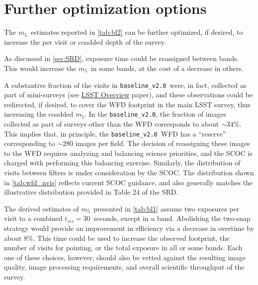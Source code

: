 \documentclass[PST,authoryear,toc]{lsstdoc}
\newcommand{\mf}{\ensuremath{m_5}}
\newcommand{\baseline}{\texttt{baseline\_v2.0}}
\begin{document}
\FloatBarrier


 
\section{Further optimization options}

The \mf\ estimates reported in \autoref{tab:bl2} can be further optimized, if desired, to increase the per visit or coadded depth of the survey. 

 
  
 As discussed in \autoref{sec:SRD}, exposure time could be reassigned between
bands. This would increase the \mf\ in some bands, at the cost of a decrease in others.
 
 A substantive fraction of the visits in \baseline\ were, in fact, collected as part of mini-surveys (see  \href{https://ls.st/lop}{{LSST Overview}} paper), and these observations could be redirected, if desired, to cover the WFD footprint in the main LSST survey, thus increasing the coadded \mf. In the \baseline, the fraction of images collected as part of surveys other than the WFD corresponds to about  $\sim34\%$. This implies that, in principle, the \baseline\ WFD has a ``reserve'' corresponding to $\sim280$ images per field.  The decision of reassigning these images to the WFD requires analyzing and balancing  science priorities, and the SCOC is charged with performing this balancing exercise. Similarly, the distribution of visits between filters is under consideration by the SCOC.  The distribution shown in \autoref{tab:wfd_nvis} reflects current SCOC guidance, and also generally matches the illustrative distribution provided in Table 24 of the SRD. 

 
The derived estimates of \mf\ presented in \autoref{tab:bl1} assume two exposures per visit to a combined $t_{vis}=30$~seconds, except in $u$ band. Abolishing the two-snap strategy would provide an improvement in efficiency via a decrease in overtime by about 8\%. This time could be used to increase the observed footprint, the number of visits for pointing, or the total exposure in all or some bands. Each one of these choices, however, should also be vetted against the resulting image quality, image processing requirements, and overall scientific throughput of the survey. 
 
\end{document}
